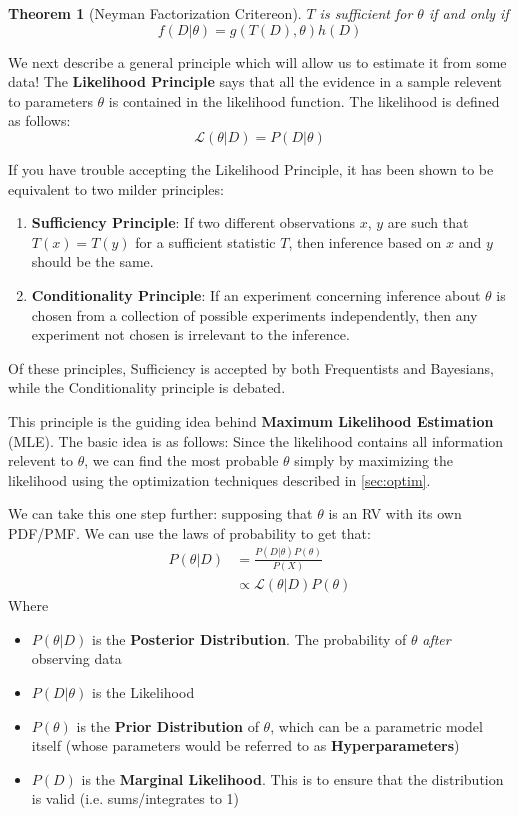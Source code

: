 \documentclass[]{article}
\theoremstyle{mattstyle}
\newtheorem{theorem}{Theorem}[section]
\theoremstyle{definition}
\begin{document}
\begin{theorem}[Neyman Factorization Critereon]
	$T$ is sufficient for $\theta$ if and only if $$f(D|\theta) = g(T(D),\theta)h(D)$$
\end{theorem}


We next describe a general principle which will allow us to estimate it from some data! The \textbf{Likelihood Principle} says that all the evidence in a sample relevent to parameters \(\theta\) is contained in the likelihood function. The likelihood is defined as follows:
$$ \mathcal{L}(\theta | D) = P(D | \theta)$$

If you have trouble accepting the Likelihood Principle, it has been shown to be equivalent to two milder principles:
\begin{enumerate}
	\item \textbf{Sufficiency Principle}: If two different observations $x$, $y$ are such that $T(x) = T(y)$ for a sufficient statistic $T$, then inference based on $x$ and $y$ should be the same.
	\item \textbf{Conditionality Principle}: If an experiment concerning inference about $\theta$ is chosen from a collection of
	possible experiments independently, then any experiment not chosen is irrelevant to the inference.
\end{enumerate}

Of these principles, Sufficiency is accepted by both Frequentists and Bayesians, while the Conditionality principle is debated. 

This principle is the guiding idea behind \textbf{Maximum Likelihood Estimation} (MLE). The basic idea is as follows: Since the likelihood contains all information relevent to $\theta$, we can find the most probable $\theta$ simply by maximizing the likelihood using the optimization techniques described in \ref{sec:optim}. 

\newpage

We can take this one step further: supposing that $\theta$ is an RV with its own PDF/PMF. We can use the laws of probability to get that:
\begin{align*}
P(\theta|D) &= \frac{P(D | \theta)P(\theta)}{P(X)}\\
&\propto\mathcal{L}(\theta | D)P(\theta)
\end{align*}
Where 
\begin{itemize}
	\item $P(\theta|D)$ is the \textbf{Posterior Distribution}. The probability of $\theta$ \emph{after} observing data
	\item $P(D|\theta)$ is the Likelihood
	\item $P(\theta)$ is the \textbf{Prior Distribution} of $\theta$, which can be a parametric model itself (whose parameters would be referred to as \textbf{Hyperparameters})
	\item $P(D)$ is the \textbf{Marginal Likelihood}. This is to ensure that the distribution is valid (i.e. sums/integrates to 1)
\end{itemize}
\end{document}
